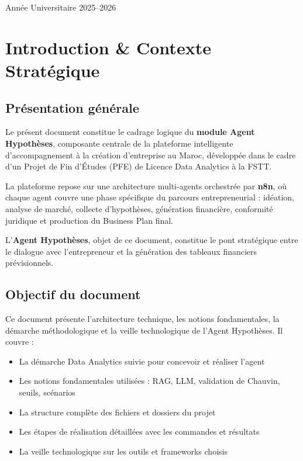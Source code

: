 \documentclass[12pt, a4paper]{report}
\begin{document}
\begin{titlepage}
\begin{center}
\vfill

{\small\color{rulegray} Année Universitaire 2025--2026}

\end{center}
\end{titlepage}

\nopagecolor
\color{black}

\tableofcontents
\newpage

\chapter{Introduction \& Contexte Stratégique}

\section{Présentation générale}

Le présent document constitue le cadrage logique du \textbf{module Agent Hypothèses}, composante centrale de la plateforme intelligente d'accompagnement à la création d'entreprise au Maroc, développée dans le cadre d'un Projet de Fin d'Études (PFE) de Licence Data Analytics à la FSTT.

La plateforme repose sur une architecture multi-agents orchestrée par \textbf{n8n}, où chaque agent couvre une phase spécifique du parcours entrepreneurial : idéation, analyse de marché, collecte d'hypothèses, génération financière, conformité juridique et production du Business Plan final.

L'\textbf{Agent Hypothèses}, objet de ce document, constitue le pont stratégique entre le dialogue avec l'entrepreneur et la génération des tableaux financiers prévisionnels.

\section{Objectif du document}

Ce document présente l'architecture technique, les notions fondamentales, la démarche méthodologique et la veille technologique de l'Agent Hypothèses. Il couvre :

\begin{itemize}
  \item La démarche Data Analytics suivie pour concevoir et réaliser l'agent
  \item Les notions fondamentales utilisées : RAG, LLM, validation de Chauvin, seuils, scénarios
  \item La structure complète des fichiers et dossiers du projet
  \item Les étapes de réalisation détaillées avec les commandes et résultats
  \item La veille technologique sur les outils et frameworks choisis
\end{itemize}
\end{document}
